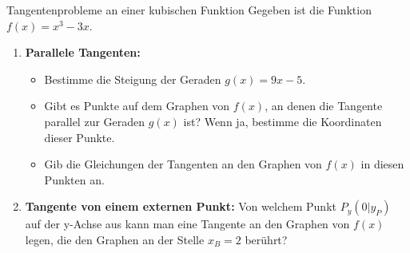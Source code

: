 \begin{aufgabenumgebung}{Tangentenprobleme an einer kubischen Funktion}
Gegeben ist die Funktion $f(x) = x^3 - 3x$.
\begin{enumerate}
    \item \textbf{Parallele Tangenten:}
        \begin{itemize}
            \item Bestimme die Steigung der Geraden $g(x) = 9x - 5$.
            \item Gibt es Punkte auf dem Graphen von $f(x)$, an denen die Tangente parallel zur Geraden $g(x)$ ist? Wenn ja, bestimme die Koordinaten dieser Punkte.
            \item Gib die Gleichungen der Tangenten an den Graphen von $f(x)$ in diesen Punkten an.
        \end{itemize}
    \item \textbf{Tangente von einem externen Punkt:}
        Von welchem Punkt $P_y(0|y_P)$ auf der y-Achse aus kann man eine Tangente an den Graphen von $f(x)$ legen, die den Graphen an der Stelle $x_B=2$ berührt?

\end{enumerate}
\end{aufgabenumgebung}

